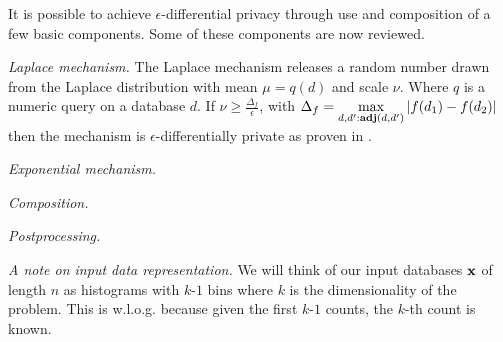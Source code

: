\documentclass{article}
\begin{document}
It is possible to achieve $\epsilon$-differential privacy through use and composition of
a few basic components. Some of these components are now reviewed.

\noindent \emph{Laplace mechanism.}
The Laplace mechanism releases a random number drawn from the Laplace distribution with
mean $\mu=q(d)$ and scale $\nu$. Where $q$ is a numeric query on a database $d$.
If $\nu\geq \frac{\Delta_f}{\epsilon}$, with $\Delta_f=\displaystyle\max_{d,d':\textbf{adj}(d,d')}{\lvert f(d_1)-f(d_2)\lvert}$
then the mechanism is $\epsilon$-differentially private as proven in \cite{???}.

\noindent \emph{Exponential mechanism.}
 
\noindent \emph{Composition.}

\noindent \emph{Postprocessing.}

\noindent \emph{A note on input data representation.}
We will think of our input databases $\textbf{x}$ of length $n$ as histograms 
with $k$-$1$ bins where $k$ is the dimensionality of the problem.
This is w.l.o.g. because given the first $k$-$1$ counts, the $k$-th count
is known.
\end{document}
